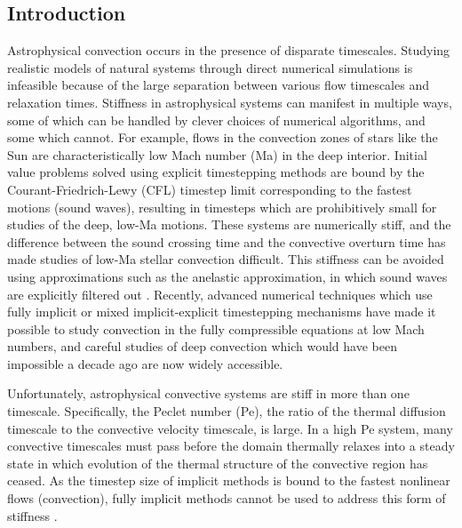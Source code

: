 \subsection{Introduction}
\label{sec:abo18_intro}
Astrophysical convection occurs in the presence of disparate timescales. 
Studying realistic models of natural systems through direct numerical simulations is infeasible because of the large separation between various flow timescales and relaxation times.
Stiffness in astrophysical systems can manifest in multiple ways, some of which can be handled by clever choices of numerical algorithms, and some which cannot.
For example, flows in the convection zones of stars like the Sun are characteristically low Mach number (Ma) in the deep interior. 
Initial value problems solved using explicit timestepping methods are bound by the Courant-Friedrich-Lewy (CFL) timestep limit corresponding to the fastest motions (sound waves), resulting in timesteps which are prohibitively small for studies of the deep, low-Ma motions. 
These systems are numerically stiff, and the difference between the sound crossing time and the convective overturn time has made studies of low-Ma stellar convection difficult. 
This stiffness can be avoided using approximations such as the anelastic approximation, in which sound waves are explicitly filtered out \citep{brown&all2010, featherstone&hindman2016a}.
Recently, advanced numerical techniques which use fully implicit \citep{viallet&all2011, viallet&all2013, viallet&all2016} or mixed implicit-explicit \citep{lecoanet&all2014, anders&brown2017, bordwell&all2018} timestepping mechanisms have made it possible to study convection in the fully compressible equations at low Mach numbers, and careful studies of deep convection which would have been impossible a decade ago are now widely accessible.

Unfortunately, astrophysical convective systems are stiff in more than one timescale. 
Specifically, the Peclet number (Pe), the ratio of the thermal diffusion timescale to the convective velocity timescale, is large.
In a high Pe system, many convective timescales must pass before the domain thermally relaxes into a steady state in which evolution of the thermal structure of the convective region has ceased.
As the timestep size of implicit methods is bound to the fastest nonlinear flows (convection), fully implicit methods cannot be used to address this form of stiffness \citep{viallet&all2011, viallet&all2013, viallet&all2016}. 

